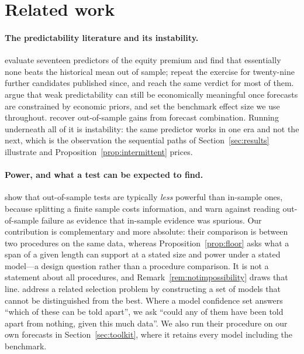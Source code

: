 \documentclass{article}
\theoremstyle{plain}
\theoremstyle{definition}
\begin{document}
\section{Related work}
\label{sec:related}

\paragraph{The predictability literature and its instability.} \citet{welch2008} evaluate
seventeen predictors of the equity premium and find that essentially none beats the historical
mean out of sample; \citet{goyal2024} repeat the exercise for twenty-nine further candidates
published since, and reach the same verdict for most of them. \citet{campbell2008} argue that
weak predictability can still be economically meaningful once forecasts are constrained by
economic priors, and set the benchmark effect size we use throughout.
\citet{rapach2010} recover out-of-sample gains from forecast combination. Running underneath
all of it is instability: the same predictor works in one era and not the next, which is the
observation the sequential paths of Section~\ref{sec:results} illustrate and
Proposition~\ref{prop:intermittent} prices.

\paragraph{Power, and what a test can be expected to find.} \citet{inoue2005} show that
out-of-sample tests are typically \emph{less} powerful than in-sample ones, because splitting
a finite sample costs information, and warn against reading out-of-sample failure as evidence
that in-sample evidence was spurious. Our contribution is complementary and more absolute:
their comparison is between two procedures on the same data, whereas
Proposition~\ref{prop:floor} asks what a span of a given length can support at a stated size and
power under a stated model---a design question rather than a procedure comparison. It is not a
statement about all procedures, and Remark~\ref{rem:notimpossibility} draws that line. \citet{hansen2011} address a related selection problem by constructing a set of
models that cannot be distinguished from the best. Where a model confidence set answers ``which of
these can be told apart'', we ask ``could any of them have been told apart from nothing, given
this much data''. We also run their procedure on our own forecasts in
Section~\ref{sec:toolkit}, where it retains every model including the benchmark.
\end{document}
